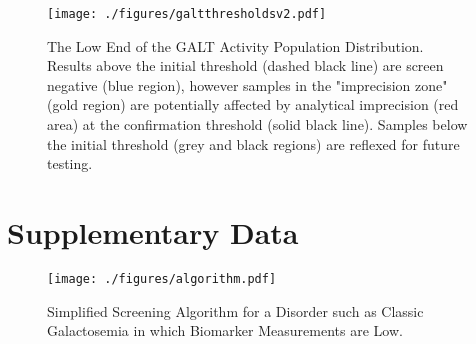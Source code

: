 \documentclass[review]{elsarticle}
\begin{document}
\begin{figure}[htbp]
\centering
\texttt{[image: ./figures/galtthresholdsv2.pdf]}
\caption{\label{fig:org21a3f0a}The Low End of the GALT Activity Population Distribution. Results above the initial threshold (dashed black line) are screen negative (blue region), however samples in the "imprecision zone" (gold region) are potentially affected by analytical imprecision (red area) at the confirmation threshold (solid black line). Samples below the initial threshold (grey and black regions) are reflexed for future testing.}
\end{figure}

\clearpage

\section*{Supplementary Data}
\label{sec:org295ce81}

\beginsupplement

\begin{figure}[htbp]
\centering
\texttt{[image: ./figures/algorithm.pdf]}
\caption{\label{fig:org0182d84}Simplified Screening Algorithm for a Disorder such as Classic Galactosemia in which Biomarker Measurements are Low.}
\end{figure}
\end{document}

